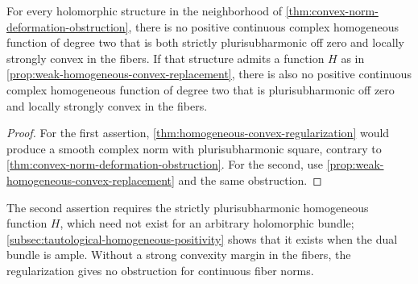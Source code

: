 \begin{corollary}\label{cor:continuous-convex-norm-obstruction}
For every holomorphic structure in the neighborhood of \cref{thm:convex-norm-deformation-obstruction}, there is no positive continuous complex homogeneous function of degree two that is both strictly plurisubharmonic off zero and locally strongly convex in the fibers. If that structure admits a function $H$ as in \cref{prop:weak-homogeneous-convex-replacement}, there is also no positive continuous complex homogeneous function of degree two that is plurisubharmonic off zero and locally strongly convex in the fibers.
\end{corollary}
\begin{proof}
For the first assertion, \cref{thm:homogeneous-convex-regularization} would produce a smooth complex norm with plurisubharmonic square, contrary to \cref{thm:convex-norm-deformation-obstruction}. For the second, use \cref{prop:weak-homogeneous-convex-replacement} and the same obstruction.
\end{proof}

The second assertion requires the strictly plurisubharmonic homogeneous function $H$, which need not exist for an arbitrary holomorphic bundle; \cref{subsec:tautological-homogeneous-positivity} shows that it exists when the dual bundle is ample. Without a strong convexity margin in the fibers, the regularization gives no obstruction for continuous fiber norms.
